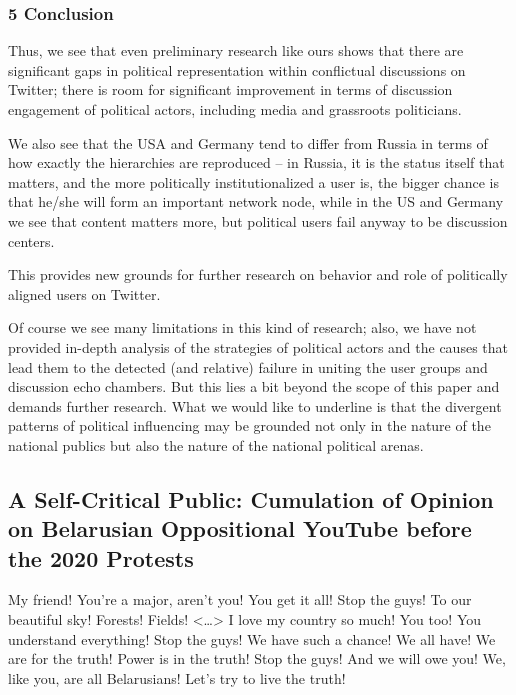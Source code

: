 \subsubsection{5 Conclusion}

Thus, we see that even preliminary research like ours shows that there are significant gaps in political representation within conflictual discussions on Twitter; there is room for significant improvement in terms of discussion engagement of political actors, including media and grassroots politicians.

We also see that the USA and Germany tend to differ from Russia in terms of how exactly the hierarchies are reproduced -- in Russia, it is the status itself that matters, and the more politically institutionalized a user is, the bigger chance is that he/she will form an important network node, while in the US and Germany we see that content matters more, but political users fail anyway to be discussion centers.

This provides new grounds for further research on behavior and role of politically aligned users on Twitter.

Of course we see many limitations in this kind of research; also, we have not provided in-depth analysis of the strategies of political actors and the causes that lead them to the detected (and relative) failure in uniting the user groups and discussion echo chambers. But this lies a bit beyond the scope of this paper and demands further research. What we would like to underline is that the divergent patterns of political influencing may be grounded not only in the nature of the national publics but also the nature of the national political arenas.

\subsection{A Self-Critical Public: Cumulation of Opinion on Belarusian Oppositional YouTube before the 2020 Protests}\label{subsec:ch2/sec5/sub6}

\begin{displayquote}
	My friend! You’re a major, aren’t you! You get it all! Stop the guys! To our beautiful sky! Forests! Fields! <…> I love my country so much! You too! You understand everything! Stop the guys! We have such a chance! We all have! We are for the truth! Power is in the truth! Stop the guys! And we will owe you! We, like you, are all Belarusians! Let's try to live the truth!
\end{displayquote}

